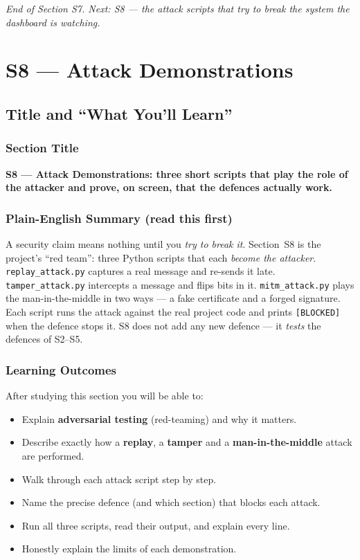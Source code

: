 \documentclass[11pt,a4paper]{report}
\begin{document}
\vfill
\begin{center}\footnotesize\itshape
End of Section S7. Next: S8 --- the attack scripts that try to break the system
the dashboard is watching.
\end{center}



\chapter{S8 --- Attack Demonstrations}

\section{Title and ``What You'll Learn''}

\subsection*{Section Title}
\textbf{S8 --- Attack Demonstrations: three short scripts that play the role of
the attacker and prove, on screen, that the defences actually work.}

\subsection*{Plain-English Summary (read this first)}
A security claim means nothing until you \emph{try to break it}. Section~S8 is
the project's ``red team'': three Python scripts that each \emph{become the
attacker}. \texttt{replay\_attack.py} captures a real message and re-sends it
late. \texttt{tamper\_attack.py} intercepts a message and flips bits in it.
\texttt{mitm\_attack.py} plays the man-in-the-middle in two ways --- a fake
certificate and a forged signature. Each script runs the attack against the real
project code and prints \texttt{[BLOCKED]} when the defence stops it. S8 does not
add any new defence --- it \emph{tests} the defences of S2--S5.

\subsection*{Learning Outcomes}
After studying this section you will be able to:
\begin{itemize}
  \item Explain \textbf{adversarial testing} (red-teaming) and why it matters.
  \item Describe exactly how a \textbf{replay}, a \textbf{tamper} and a
        \textbf{man-in-the-middle} attack are performed.
  \item Walk through each attack script step by step.
  \item Name the precise defence (and which section) that blocks each attack.
  \item Run all three scripts, read their output, and explain every line.
  \item Honestly explain the limits of each demonstration.
\end{itemize}
\end{document}
